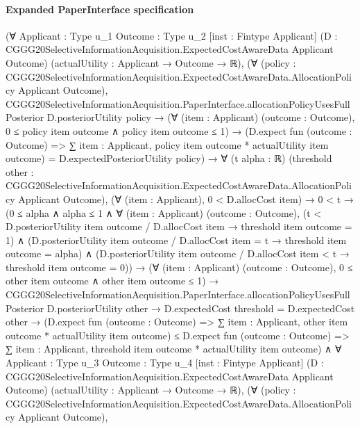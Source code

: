 \documentclass[10pt]{article}
\begin{document}
\paragraph{Expanded PaperInterface specification}
\begin{ReviewVerbatim}
(∀ {Applicant : Type u_1} {Outcome : Type u_2} [inst : Fintype Applicant]
    (D : CGGG20SelectiveInformationAcquisition.ExpectedCostAwareData Applicant Outcome)
    (actualUtility : Applicant → Outcome → ℝ),
    (∀ (policy : CGGG20SelectiveInformationAcquisition.ExpectedCostAwareData.AllocationPolicy Applicant Outcome),
        CGGG20SelectiveInformationAcquisition.PaperInterface.allocationPolicyUsesFullPosterior D.posteriorUtility
            policy →
          (∀ (item : Applicant) (outcome : Outcome), 0 ≤ policy item outcome ∧ policy item outcome ≤ 1) →
            (D.expect fun (outcome : Outcome) => ∑ item : Applicant, policy item outcome * actualUtility item outcome) =
              D.expectedPosteriorUtility policy) →
      ∀ (t alpha : ℝ)
        (threshold other :
          CGGG20SelectiveInformationAcquisition.ExpectedCostAwareData.AllocationPolicy Applicant Outcome),
        (∀ (item : Applicant), 0 < D.allocCost item) →
          0 < t →
            (0 ≤ alpha ∧
                alpha ≤ 1 ∧
                  ∀ (item : Applicant) (outcome : Outcome),
                    (t < D.posteriorUtility item outcome / D.allocCost item → threshold item outcome = 1) ∧
                      (D.posteriorUtility item outcome / D.allocCost item = t → threshold item outcome = alpha) ∧
                        (D.posteriorUtility item outcome / D.allocCost item < t → threshold item outcome = 0)) →
              (∀ (item : Applicant) (outcome : Outcome), 0 ≤ other item outcome ∧ other item outcome ≤ 1) →
                CGGG20SelectiveInformationAcquisition.PaperInterface.allocationPolicyUsesFullPosterior
                    D.posteriorUtility other →
                  D.expectedCost threshold = D.expectedCost other →
                    (D.expect fun (outcome : Outcome) =>
                        ∑ item : Applicant, other item outcome * actualUtility item outcome) ≤
                      D.expect fun (outcome : Outcome) =>
                        ∑ item : Applicant, threshold item outcome * actualUtility item outcome) ∧
  ∀ {Applicant : Type u_3} {Outcome : Type u_4} [inst : Fintype Applicant]
    (D : CGGG20SelectiveInformationAcquisition.ExpectedCostAwareData Applicant Outcome)
    (actualUtility : Applicant → Outcome → ℝ),
    (∀ (policy : CGGG20SelectiveInformationAcquisition.ExpectedCostAwareData.AllocationPolicy Applicant Outcome),

\end{ReviewVerbatim}
\end{document}
